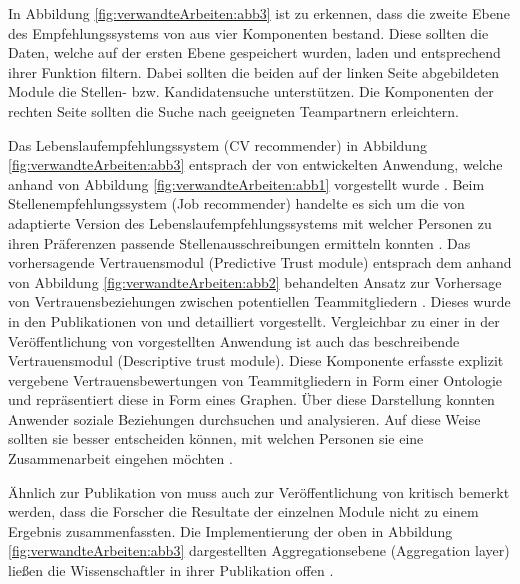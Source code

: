 In Abbildung \ref{fig:verwandteArbeiten:abb3} ist zu erkennen, dass die zweite Ebene des Empfehlungssystems von \textcite[S. 5ff.]{keim:2007} aus vier Komponenten bestand. Diese sollten die Daten, welche auf der ersten Ebene gespeichert wurden, laden und entsprechend ihrer Funktion filtern. Dabei sollten die beiden auf der linken Seite abgebildeten Module die Stellen- bzw. Kandidatensuche unterstützen. Die Komponenten der rechten Seite sollten die Suche nach geeigneten Teampartnern erleichtern.

Das Lebenslaufempfehlungssystem (CV recommender) in Abbildung \ref{fig:verwandteArbeiten:abb3} entsprach der von \textcite[S. 8ff.]{faerber:2003} entwickelten Anwendung, welche anhand von Abbildung \ref{fig:verwandteArbeiten:abb1} vorgestellt wurde \cite[S. 6]{keim:2007}. Beim Stellenempfehlungssystem (Job recommender) handelte es sich um die von \textcite[S. 4ff.]{malinowski:2006} adaptierte Version des Lebenslaufempfehlungssystems mit welcher Personen zu ihren Präferenzen passende Stellenausschreibungen ermitteln konnten \cite[S. 6]{keim:2007}. Das vorhersagende Vertrauensmodul (Predictive Trust module) entsprach dem anhand von Abbildung \ref{fig:verwandteArbeiten:abb2} behandelten Ansatz zur Vorhersage von Vertrauensbeziehungen zwischen potentiellen Teammitgliedern \cite[S. 8]{keim:2007}. Dieses wurde in den Publikationen von \textcite[S. 5ff.]{keim:2005} und \textcite[S. 4ff.]{malinowski:2005} detailliert vorgestellt. Vergleichbar zu einer in der Veröffentlichung von \textcite[S. 4f.]{keim:2005} vorgestellten Anwendung ist auch das beschreibende Vertrauensmodul (Descriptive trust module). Diese Komponente erfasste explizit vergebene Vertrauensbewertungen von Teammitgliedern in Form einer Ontologie und repräsentiert diese in Form eines Graphen. Über diese Darstellung konnten Anwender soziale Beziehungen durchsuchen und analysieren. Auf diese Weise sollten sie besser entscheiden können, mit welchen Personen sie eine Zusammenarbeit eingehen möchten \cite[S. 7]{keim:2007}.

Ähnlich zur Publikation von \textcite[S. 3ff.]{malinowski:2006} muss auch zur Veröffentlichung von \textcite[S. 5ff.]{keim:2007} kritisch bemerkt werden, dass die Forscher die Resultate der einzelnen Module nicht zu einem Ergebnis zusammenfassten. Die Implementierung der oben in Abbildung \ref{fig:verwandteArbeiten:abb3} dargestellten Aggregationsebene (Aggregation layer) ließen die Wissenschaftler in ihrer Publikation offen \cite[S. 8]{keim:2007}.



